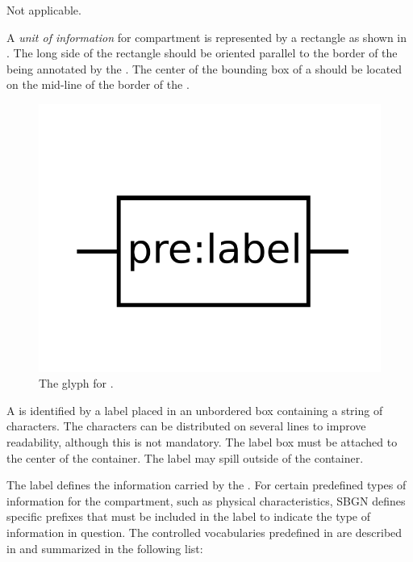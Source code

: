 \begin{glyphDescription}

\glyphSboTerm Not applicable.

\glyphContainer A \emph{unit of information} for compartment is represented by a rectangle as shown in .  The long side of the rectangle should be oriented parallel to the border of the  being annotated by the . The center of the bounding box of a  should be located on the mid-line of the border of the .

\begin{figure}[H]
  \centering
  \includegraphics[scale = 0.5]{images/unitInformation}
  \caption{The \AF glyph for .}
  \label{fig:compunitInfo}
\end{figure}

\glyphLabel A  is identified by a label placed in an unbordered box containing a string of characters.  The characters can be distributed on several lines to improve readability, although this is not mandatory.  The label box must be attached to the center of the container.  The label may spill outside of the container.

The label defines the information carried by the .  For certain predefined types of information for the compartment, such as physical characteristics, SBGN defines specific prefixes that must be included in the label to indicate the type of information in question.  The controlled vocabularies predefined in \SBGNAFLone are described in  and summarized in the following list:


\end{glyphDescription}
